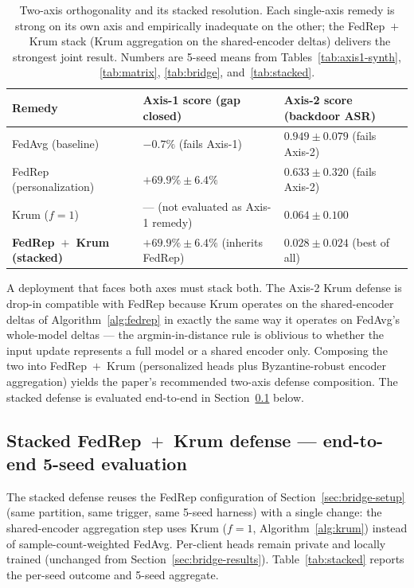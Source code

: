 \documentclass[preprint,12pt,authoryear]{elsarticle}
\begin{document}
\begin{table}[!ht]
\centering
\footnotesize
\setlength{\tabcolsep}{6pt}
\renewcommand{\arraystretch}{1.2}
\caption{Two-axis orthogonality and its stacked resolution. Each
single-axis remedy is strong on its own axis and empirically
inadequate on the other; the FedRep~$+$~Krum stack (Krum aggregation
on the shared-encoder deltas) delivers the strongest joint result.
Numbers are 5-seed means from Tables~\ref{tab:axis1-synth},
\ref{tab:matrix}, \ref{tab:bridge}, and~\ref{tab:stacked}.}
\label{tab:orthogonality}
\begin{tabular}{@{}l l l@{}}
\toprule
Remedy & Axis-1 score (gap closed) & Axis-2 score (backdoor ASR) \\
\midrule
FedAvg (baseline)          & $-0.7\%$ (fails Axis-1)               & $0.949 \pm 0.079$ (fails Axis-2) \\
FedRep (personalization)   & \textbf{$+69.9\% \pm 6.4\%$}          & $0.633 \pm 0.320$ (fails Axis-2) \\
Krum ($f = 1$)             & --- (not evaluated as Axis-1 remedy)  & $0.064 \pm 0.100$ \\
\midrule
\textbf{FedRep~$+$~Krum (stacked)} & \textbf{$+69.9\% \pm 6.4\%$} (inherits FedRep) & \textbf{$0.028 \pm 0.024$} (best of all) \\
\bottomrule
\end{tabular}
\end{table}

A deployment that faces both axes must stack both. The Axis-2 Krum
defense is drop-in compatible with FedRep because Krum operates on
the shared-encoder deltas of Algorithm~\ref{alg:fedrep} in exactly
the same way it operates on FedAvg's whole-model deltas --- the
argmin-in-distance rule is oblivious to whether the input update
represents a full model or a shared encoder only. Composing the two
into FedRep~$+$~Krum (personalized heads plus Byzantine-robust
encoder aggregation) yields the paper's recommended two-axis defense
composition. The stacked defense is evaluated end-to-end in
Section~\ref{sec:bridge-stacked} below.

\subsection{Stacked FedRep~$+$~Krum defense --- end-to-end 5-seed evaluation}
\label{sec:bridge-stacked}

The stacked defense reuses the FedRep configuration of
Section~\ref{sec:bridge-setup} (same partition, same trigger, same
5-seed harness) with a single change: the shared-encoder aggregation
step uses Krum ($f = 1$, Algorithm~\ref{alg:krum}) instead of
sample-count-weighted FedAvg. Per-client heads remain private and
locally trained (unchanged from Section~\ref{sec:bridge-results}).
Table~\ref{tab:stacked} reports the per-seed outcome and 5-seed
aggregate.
\end{document}
